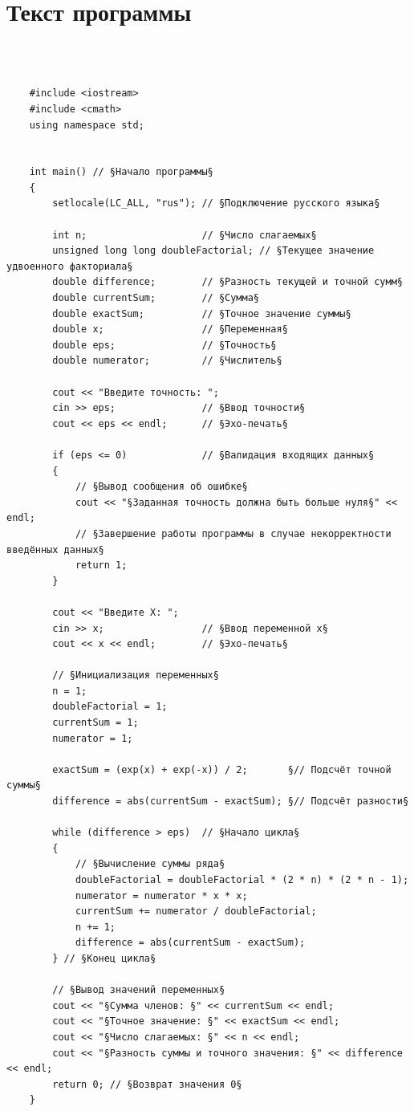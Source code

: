 \documentclass[a4paper]{article}
\begin{document}
	\newpage
	
	\section{Текст программы}
	
	\
	\begin{lstlisting}[style={CppCodeStyle}]
	
	#include <iostream>
	#include <cmath>
	using namespace std;
	
	
	int main() // §Начало программы§
	{
		setlocale(LC_ALL, "rus"); // §Подключение русского языка§
		
		int n;                    // §Число слагаемых§
		unsigned long long doubleFactorial; // §Текущее значение удвоенного факториала§
		double difference;        // §Разность текущей и точной сумм§
		double currentSum;        // §Сумма§
		double exactSum;          // §Точное значение суммы§
		double x;                 // §Переменная§
		double eps;               // §Точность§
		double numerator;         // §Числитель§
		
		cout << "Введите точность: ";
		cin >> eps;               // §Ввод точности§
		cout << eps << endl;      // §Эхо-печать§
		
		if (eps <= 0)             // §Валидация входящих данных§
		{
			// §Вывод сообщения об ошибке§
			cout << "§Заданная точность должна быть больше нуля§" << endl; 
			// §Завершение работы программы в случае некорректности введённых данных§
			return 1;
		}
		
		cout << "Введите X: ";
		cin >> x;                 // §Ввод переменной x§
		cout << x << endl;        // §Эхо-печать§
		
		// §Инициализация переменных§
		n = 1;
		doubleFactorial = 1;
		currentSum = 1;
		numerator = 1;
		
		exactSum = (exp(x) + exp(-x)) / 2;       §// Подсчёт точной суммы§
		difference = abs(currentSum - exactSum); §// Подсчёт разности§
		
		while (difference > eps)  // §Начало цикла§
		{
			// §Вычисление суммы ряда§
			doubleFactorial = doubleFactorial * (2 * n) * (2 * n - 1);
			numerator = numerator * x * x;
			currentSum += numerator / doubleFactorial;
			n += 1;
			difference = abs(currentSum - exactSum);
		} // §Конец цикла§
		
		// §Вывод значений переменных§
		cout << "§Сумма членов: §" << currentSum << endl;
		cout << "§Точное значение: §" << exactSum << endl;
		cout << "§Число слагаемых: §" << n << endl;
		cout << "§Разность суммы и точного значения: §" << difference << endl;
		return 0; // §Возврат значения 0§
	}
	
	\end{lstlisting}
	\newpage
	
\end{document}
